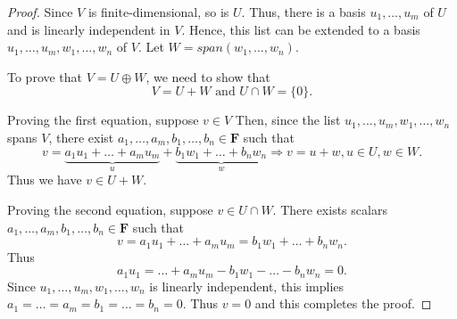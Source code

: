 \documentclass[11pt]{article}
\begin{document}
    \begin{proof}
        Since $V$ is finite-dimensional, so is $U$. Thus, there is a basis \(u_1, \dots, u_m\) of $U$ and is linearly independent in $V$. Hence, this list can be extended to a basis \(u_1, \dots, u_m, w_1, \dots, w_n\) of $V$. Let \(W = span(w_1, \dots, w_n)\).
        
        \vspace{1em}

        To prove that \(V = U \oplus W\), we need to show that \[V = U + W \text{ and } U \cap W = \{0\}.\]

        Proving the first equation, suppose \(v \in V\) Then, since the list \(u_1, \dots, u_m, w_1, \dots, w_n\) spans $V$, there exist \(a_1, \dots, a_m, b_1, \dots, b_n \in \textbf{F}\) such that 
        \begin{equation*}
            v = \underbrace{a_1u_1 + \dots + a_m u_m}_{u} + \underbrace{b_1 w_1 + \dots + b_n w_n}_{w} \Rightarrow v = u + w, u \in U, w \in W.
        \end{equation*}
        Thus we have \(v \in U + W\).

        Proving the second equation, suppose \(v \in U \cap W\). There exists scalars \(a_1, \dots, a_m, b_1, \dots, b_n \in \textbf{F}\) such that \[ v = a_1 u_1 + \dots + a_m u_m = b_1 w_1 + \dots + b_n w_n. \] Thus \[a_1 u_1 = \dots + a_m u_m - b_1 w_1 - \dots - b_n w_n = 0.\] Since \(u_1, \dots, u_m, w_1, \dots, w_n\) is linearly independent, this implies \(a_1 = \dots = a_m = b_1 = \dots = b_n = 0.\) Thus \(v = 0\) and this completes the proof.
    \end{proof}


    
\end{document}
